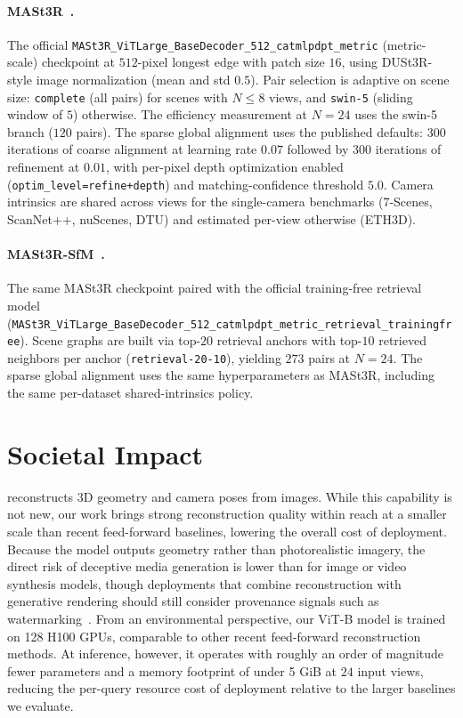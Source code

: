 \paragraph{MASt3R~\citep{leroy2025grounding}.}
The official \texttt{MASt3R\_ViTLarge\_BaseDecoder\allowbreak\_512\_catmlpdpt\_metric} (metric-scale) checkpoint at $512$-pixel longest edge with patch size $16$, using DUSt3R-style image normalization (mean and std $0.5$). Pair selection is adaptive on scene size: \texttt{complete} (all pairs) for scenes with $N \le 8$ views, and \texttt{swin-5} (sliding window of $5$) otherwise. The efficiency measurement at $N{=}24$ uses the swin-5 branch ($120$ pairs). The sparse global alignment uses the published defaults: $300$ iterations of coarse alignment at learning rate $0.07$ followed by $300$ iterations of refinement at $0.01$, with per-pixel depth optimization enabled (\texttt{optim\_level=refine+depth}) and matching-confidence threshold $5.0$. Camera intrinsics are shared across views for the single-camera benchmarks (7-Scenes, ScanNet++, nuScenes, DTU) and estimated per-view otherwise (ETH3D).

\paragraph{MASt3R-SfM~\citep{duisterhof2024mast3rsfm}.}
The same MASt3R checkpoint paired with the official training-free retrieval model (\texttt{MASt3R\_ViTLarge\_BaseDecoder\_512\_catmlpdpt\_metric\_retrieval\_trainingfree}). Scene graphs are built via top-$20$ retrieval anchors with top-$10$ retrieved neighbors per anchor (\texttt{retrieval-20-10}), yielding $273$ pairs at $N{=}24$. The sparse global alignment uses the same hyperparameters as MASt3R, including the same per-dataset shared-intrinsics policy.


\section{Societal Impact}
\label{sec:suppl_societal_impact}
\methodname{} reconstructs 3D geometry and camera poses from images. While this capability is not new, our work brings strong reconstruction quality within reach at a smaller scale than recent feed-forward baselines, lowering the overall cost of deployment. Because the model outputs geometry rather than photorealistic imagery, the direct risk of deceptive media generation is lower than for image or video synthesis models, though deployments that combine reconstruction with generative rendering should still consider provenance signals such as watermarking~\citep{wen2023treering}. From an environmental perspective, our ViT-B model is trained on 128 H100 GPUs, comparable to other recent feed-forward reconstruction methods. At inference, however, it operates with roughly an order of magnitude fewer parameters and a memory footprint of under 5 GiB at $24$ input views, reducing the per-query resource cost of deployment relative to the larger baselines we evaluate.








